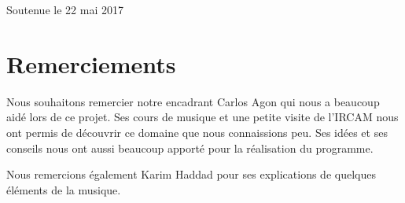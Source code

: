 \documentclass[a4paper,12pt]{article}
\begin{document}
\begin{titlepage}
\begin{center}
\vspace*{2cm}

{\large Soutenue le 22 mai 2017}\\[1cm]

\vfill

\end{center}
\end{titlepage}


\newpage\null\thispagestyle{empty}\newpage


\tableofcontents

\newpage\null\thispagestyle{empty}\newpage



\section{Remerciements}

Nous souhaitons remercier notre encadrant Carlos Agon qui nous a beaucoup aidé lors de ce projet. Ses cours de musique et une petite visite de l'IRCAM nous ont permis de découvrir ce domaine que nous connaissions peu. Ses idées et ses conseils nous ont aussi beaucoup apporté pour la réalisation du programme.

\par
Nous remercions également Karim Haddad pour ses explications de quelques éléments de la musique.


\newpage\null\thispagestyle{empty}\newpage



\listoffigures %

\newpage\null\thispagestyle{empty}\newpage









\pagestyle{fancy}










%





\nocite{*}
\end{document}
